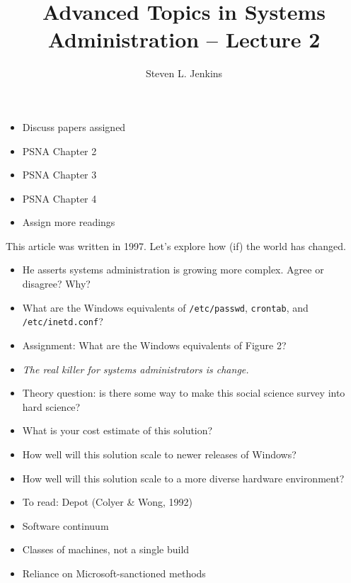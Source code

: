 \documentclass{slides}
\title{Advanced Topics in Systems Administration -- Lecture 2}
\author{Steven L. Jenkins}
\newcommand{\bi}{\begin{itemize}}
\newcommand{\ei}{\end{itemize}}
\begin{document}
\maketitle


\bi
\item Discuss papers assigned
\item PSNA Chapter 2
\item PSNA Chapter 3
\item PSNA Chapter 4
\item Assign more readings
\ei


This article was written in 1997.  Let's explore how (if) the 
world has changed.

\bi
\item He asserts systems administration is growing more 
	complex.  Agree or disagree?  Why?

\item What are the Windows equivalents of {\tt /etc/passwd},
	{\tt crontab}, and {\tt /etc/inetd.conf}?

\item Assignment: What are the Windows equivalents of Figure 2?  

\item \emph{The real killer for systems administrators is change.}

\item Theory question: is there some way to make this social
	science survey into hard science?  
\ei


\bi
\item What is your cost estimate of this solution?
\item How well will this solution scale to newer releases of Windows?
\item How well will this solution scale to a more diverse hardware
	environment?
\ei



\bi
\item To read: Depot (Colyer \& Wong, 1992)
\item Software continuum
\item Classes of machines, not a single build
\item Reliance on Microsoft-sanctioned methods
\ei

\end{document}
